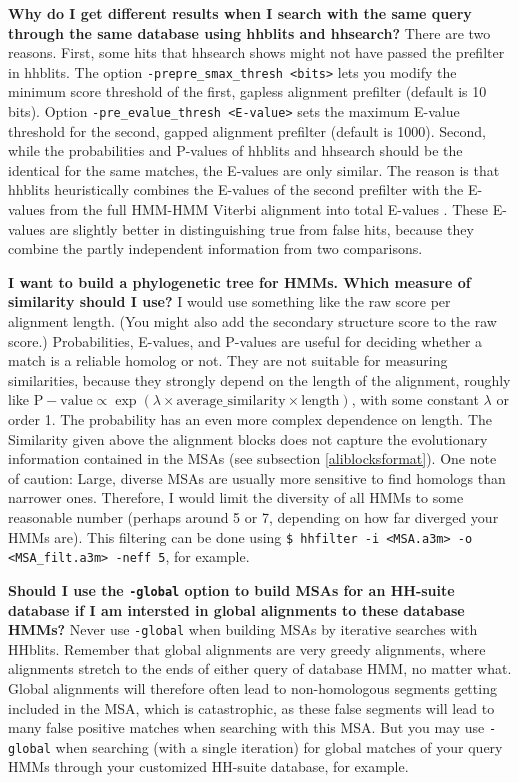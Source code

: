 \documentclass[11pt,a4paper]{article}
\begin{document}
{\bf Why do I get different results when I search with the same query through the same database using hhblits and hhsearch?} There are two reasons. First, some hits that hhsearch shows might not have passed the prefilter in hhblits. The option \verb`-prepre_smax_thresh <bits>` lets you modify the minimum score threshold of the first, gapless alignment prefilter (default is 10 bits). Option \verb`-pre_evalue_thresh <E-value>` sets the maximum E-value threshold for the second, gapped alignment prefilter (default is 1000). Second, while the probabilities and P-values of hhblits and hhsearch should be the identical for the same matches, the E-values are only similar. The reason is that hhblits heuristically combines the E-values of the second prefilter with the E-values from the full HMM-HMM Viterbi alignment into total E-values \cite{Remmert:2011}. These E-values are slightly better in distinguishing true from false hits, because they combine the partly independent information from two comparisons.

{\bf I want to build a phylogenetic tree for HMMs. Which measure of similarity should I use?}
I would use something like the raw score per alignment length. (You might also add the secondary structure score to the raw score.) Probabilities, E-values, and P-values are useful for deciding whether a match is a reliable homolog or not. They are not suitable for measuring similarities, because they strongly depend on the length of the alignment, roughly like $\mathrm{P-value} \propto \exp(\lambda \times \mathrm{average\_similarity} \times \mathrm{length})$, with some constant $\lambda$ or order 1. The probability has an even more complex dependence on length. The Similarity given above the alignment blocks does not capture the evolutionary information contained in the MSAs (see subsection \ref{aliblocksformat}). One note of caution: Large, diverse MSAs are usually more sensitive to find homologs than narrower ones. Therefore, I would limit the diversity of all HMMs to some reasonable number (perhaps around 5 or 7, depending on how far diverged your HMMs are). This filtering can be done using \verb`$ hhfilter -i <MSA.a3m> -o <MSA_filt.a3m> -neff 5`, for example. 

{\bf Should I use the \verb`-global` option to build MSAs for an HH-suite database if I am intersted in global alignments to these database HMMs?}
Never use \verb`-global` when building MSAs by iterative searches with HHblits. Remember that global alignments are very greedy alignments, where alignments stretch to the ends of either query of database HMM, no matter what. Global alignments will therefore often lead to non-homologous segments getting included in the MSA, which is catastrophic, as these false segments will lead to many false positive matches when searching with this MSA. But you may use \verb`-global` when searching (with a single iteration) for global matches of your query HMMs through your customized HH-suite database, for example.
\end{document}
